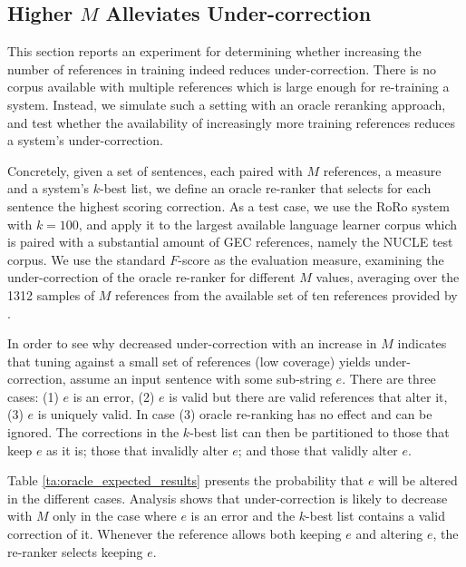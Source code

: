 \documentclass[a4paper]{article}
\begin{document}
\subsection{Higher $M$ Alleviates Under-correction}\label{subsec:reranking}

This section reports an experiment for determining whether increasing
the number of references in training indeed reduces under-correction. There is no 
corpus available with multiple references which is large enough for re-training a system. 
Instead, we simulate such a setting with an oracle reranking approach, and test whether the 
availability of increasingly more training references reduces a system's under-correction.

Concretely, given a set of sentences, each paired with $M$ references, a measure and a 
system's $k$-best list, we define an oracle re-ranker that selects for each sentence the highest scoring correction.
As a test case, we use the RoRo system with $k=100$, and apply it to the 
largest available language learner corpus which is paired with a substantial amount of GEC references,
namely the NUCLE test corpus. We use the standard $F$-score as the evaluation measure,
examining the under-correction of the oracle re-ranker for different $M$ values, averaging over the 1312 samples of 
$M$ references from the available set of ten references provided by \citet{bryant2015far}.

In order to see why decreased under-correction with an increase in $M$ indicates
that tuning against a small set of references (low coverage) yields under-correction, 
assume an input sentence with some sub-string $e$. 
There are three cases: (1) $e$ is an error, (2) $e$ is valid but there are valid references that alter it, (3) $e$ is uniquely valid. In case (3) oracle re-ranking has no effect and can be ignored.
The corrections in the $k$-best list can then be partitioned to those that keep $e$ as it is; those that invalidly alter $e$; and those that validly alter $e$. 

Table \ref{ta:oracle_expected_results} presents the probability that $e$ will be altered in the different cases.
Analysis shows that under-correction is likely to decrease with $M$ only
in the case where $e$ is an error and the $k$-best list contains a valid correction of it.
Whenever the reference allows both keeping $e$ and altering $e$, the re-ranker selects keeping $e$. 
\end{document}
